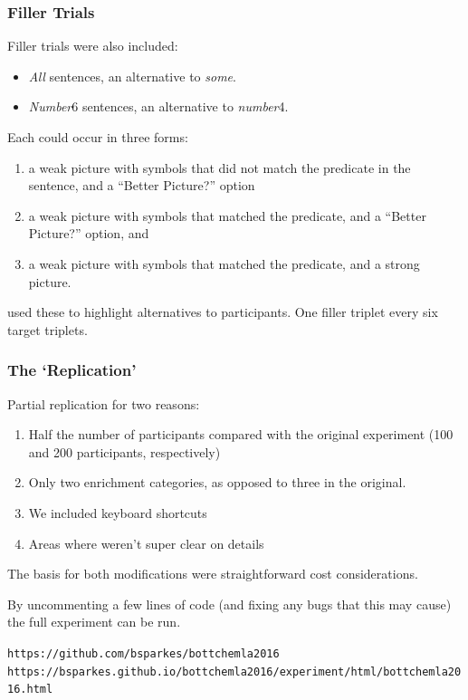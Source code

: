 \documentclass[noamssymb]{beamer}
\begin{document}
\begin{frame}
  \frametitle{{\ftf Filler Trials}}

  Filler trials were also included:

  \begin{itemize}
  \item \emph{All} sentences, an alternative to \emph{some}.
  \item \emph{Number}6 sentences, an alternative to \emph{number}4.
  \end{itemize}

Each could occur in three forms:
\begin{enumerate}[label=(\arabic*)]
\item a weak picture with symbols that did not match the predicate in the sentence, and a ``Better Picture?'' option
\item a weak picture with symbols that matched the predicate, and a ``Better Picture?'' option, and
\item a weak picture with symbols that matched the predicate, and a strong picture.
\end{enumerate}
\citeauthor{Bott:2016aa} used these to highlight alternatives to participants.
One filler triplet every six target triplets.
\end{frame}


\begin{frame}
  \frametitle{{\ftf The `Replication'}}
  Partial replication for two reasons:
\begin{enumerate}[label=\arabic*)]
\item Half the number of participants compared with the original experiment (100 and 200 participants, respectively)
\item Only two enrichment categories, as opposed to three in the original.
\item We included keyboard shortcuts
\item Areas where \citeauthor{Bott:2016aa} weren't super clear on details
\end{enumerate}
The basis for both modifications were straightforward cost considerations.

By uncommenting a few lines of code (and fixing any bugs that this may cause) the full experiment can be run.

{\footnotesize
\texttt{https://github.com/bsparkes/bottchemla2016}
\texttt{https://bsparkes.github.io/bottchemla2016/experiment/html/bottchemla2016.html}
}

\end{frame}
\end{document}
